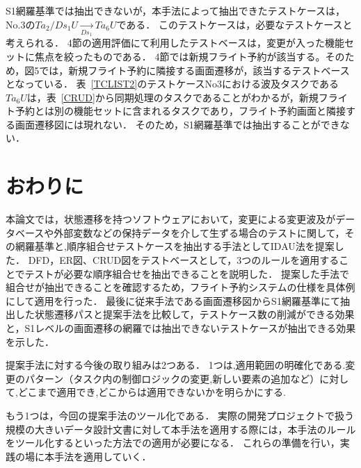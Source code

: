 \documentclass[a4paper,11pt]{jreport}
\begin{document}
S1網羅基準では抽出できないが，本手法によって抽出できたテストケースは，No.3の$Ta_2/Ds_1U  \xrightarrow[Ds_1]{} Ta_6U$である．
このテストケースは，必要なテストケースと考えられる．
4節の適用評価にて利用したテストベースは，変更が入った機能セットに焦点を絞ったものである．
4節では新規フライト予約が該当する。そのため，図5では，新規フライト予約に隣接する画面遷移が，該当するテストベースとなっている．
表~\ref{TCLIST2}のテストケースNo3における波及タスクである$Ta_6U$は，表~\ref{CRUD}から同期処理のタスクであることがわかるが，新規フライト予約とは別の機能セットに含まれるタスクであり，フライト予約画面と隣接する画面遷移図には現れない．
そのため，S1網羅基準では抽出することができない．

\section{おわりに}

本論文では，状態遷移を持つソフトウェアにおいて，変更による変更波及がデータベースや外部変数などの保持データを介して生ずる場合のテストに関して，その網羅基準と,順序組合せテストケースを抽出する手法としてIDAU法を提案した．
DFD，ER図、CRUD図をテストベースとして，3つのルールを適用することでテストが必要な順序組合せを抽出できることを説明した．
提案した手法で組合せが抽出できることを確認するため，フライト予約システムの仕様を具体例にして適用を行った．
最後に従来手法である画面遷移図からS1網羅基準にて抽出した状態遷移パスと提案手法を比較して，テストケース数の削減ができる効果と，S1レベルの画面遷移の網羅では抽出できないテストケースが抽出できる効果を示した．

提案手法に対する今後の取り組みは2つある．
1つは,適用範囲の明確化である.変更のパターン（タスク内の制御ロジックの変更,新しい要素の追加など）に対して,どこまで適用でき,どこからは適用できないかを明らかにする.

もう1つは，今回の提案手法のツール化である．
実際の開発プロジェクトで扱う規模の大きいデータ設計文書に対して本手法を適用する際には，本手法のルールをツール化するといった方法での適用が必要になる．
これらの準備を行い，実践の場に本手法を適用していく．
\end{document}
